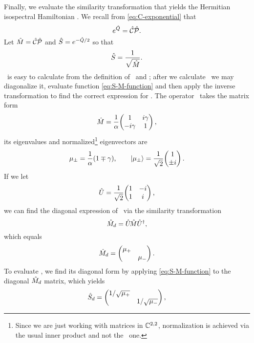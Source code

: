         Finally, we evaluate the similarity transformation that yields the Hermitian isospectral Hamiltonian \hF. We recall from \eqref{eq:C-exponential} that
        \begin{equation*}
            e^{\hat{Q}} = \mathcal{\hat{C}}\mathcal{\hat{P}}
            \text{.}
        \end{equation*}
        Let $\hat{M} = \mathcal{\hat{C}}\mathcal{\hat{P}}$ and $\hat{S} = e^{-\hat{Q}/2}$ so that
        \begin{equation}
            \label{eq:S-M-function}
            \hat{S} = \frac{1}{\sqrt{\hat{M}}}
            \text{.}
        \end{equation}
        \hM\ is easy to calculate from the definition of \hC\ and \hP; after we calculate \hM\ we may diagonalize it, evaluate function \eqref{eq:S-M-function} and then apply the inverse transformation to find the correct expression for \hS. The operator \hM\ takes the matrix form
        \begin{equation*}
            \hM = \frac{1}{\alpha}\!\pmqty{\admat[1]{i\gamma, -i\gamma}}
            \mycomma
        \end{equation*}
        its eigenvalues and normalized\footnote{Since we are just working with matrices in $\mathbb{C}^{2,2}$, normalization is achieved via the usual inner product and not the \PT\ one.} eigenvectors are
        \begin{equation*}
            \mu_{\pm} = \frac{1}{\alpha}\pqty{1 \mp \gamma}
            \mycomma
            \qquad
            \ket{\mu_\pm} = \frac{1}{\sqrt{2}}\!\pmqty{1 \\ \pm i}
            \myperiod
        \end{equation*}
        If we let
        \begin{equation*}
            \hU = \frac{1}{\sqrt{2}}\!\pmqty{1 & -i \\ 1 & i}
            \mycomma
        \end{equation*}
        we can find the diagonal expression of \hM\ via the similarity transformation
        \begin{equation}
            \hat{M}_d = \hat{U} \!\hat{M} \hat{U}^\dag
            \text{,}
        \end{equation}
        which equals
        \begin{equation*}
            \hM_d = \pmqty{\dmat{\mu_{+}, \mu_{-}}}
            \myperiod
        \end{equation*}
        To evaluate \hS, we find its diagonal form by applying \eqref{eq:S-M-function} to the diagonal $\hat{M}_d$ matrix, which yields
        \begin{equation*}
            \hS_d = \pmqty{\dmat{1/\sqrt{\mu_{+}}, 1/\sqrt{\mu_{-}}}}
            \mycomma
        \end{equation*}
